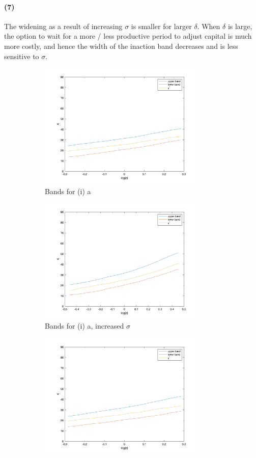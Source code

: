 \documentclass[10pt,letter]{article}
\newcommand{\problempart}[1]{\paragraph{#1}}
\begin{document}
\problempart{(7)} The widening as a result of increasing $\sigma$ is smaller for larger $\delta$. When $\delta$ is large, the option to wait for a more / less productive period to adjust capital is much more costly, and hence the width of the inaction band decreases and is less sensitive to $\sigma$.
\begin{center}
\begin{figure}
\begin{subfigure}{.5\textwidth}
\includegraphics[width=8cm]{ps3q2_fig17}
\caption{Bands for (i) a}
\end{subfigure}
\begin{subfigure}{.5\textwidth}
\includegraphics[width=8cm]{ps3q2_fig18}
\caption{Bands for (i) a, increased $\sigma$}
\end{subfigure}
\begin{subfigure}{.5\textwidth}
\includegraphics[width=8cm]{ps3q2_fig19}

\end{subfigure}
\end{figure}
\end{center}
\end{document}
